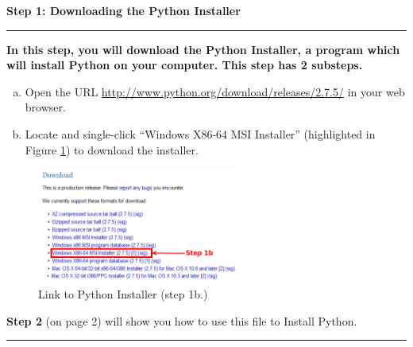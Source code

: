 \documentclass[11pt,english]{article}
\newcommand{\myhrule}{\vspace{0.3cm}\hrule\vspace{0.3cm}}
\begin{document}
{\Large {\bf Step 1: Downloading the Python Installer}}
\myhrule
{\bf In this step, you will download the Python Installer, a program which will
install Python on your computer. This step has 2 substeps.}
\begin{enumerate}[a.]
\item Open the URL
{\color{blue} \underline{http://www.python.org/download/releases/2.7.5/}} in
your web browser.
\item Locate and single-click ``Windows X86-64 MSI Installer'' (highlighted in
Figure \ref{fig:dia1}) to download the installer.
\end{enumerate}
\begin{figure}[h]
\begin{center}
\includegraphics[width=0.6\textwidth]{dia1}
\end{center}
\caption{Link to Python Installer (step 1b.)}
\label{fig:dia1}
\end{figure}
\vfill
{\bf Step 2} (on page 2) will show you how to use this file to Install Python.
\myhrule
\end{document}
